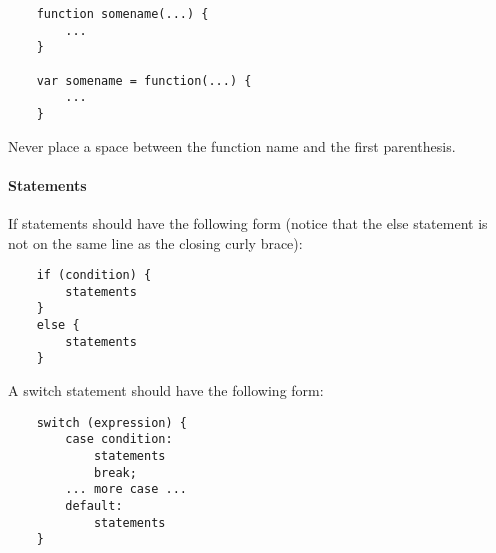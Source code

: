 \begin{lstlisting}
	function somename(...) {
		...
	}

	var somename = function(...) {
		...
	}
\end{lstlisting}

Never place a space between the function name and the first parenthesis.

\paragraph{Statements} \hspace{1mm}

If statements should have the following form (notice that the else statement is
not on the same line as the closing curly brace):

\begin{lstlisting}
	if (condition) {
		statements
	}
	else {
		statements
	}
\end{lstlisting}

A switch statement should have the following form:

\begin{lstlisting}
	switch (expression) {
		case condition:
			statements
			break;
		... more case ...
		default:
			statements
	}
\end{lstlisting}
